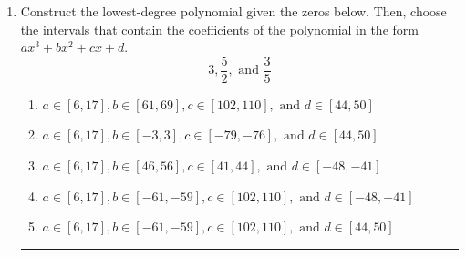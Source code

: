\documentclass[14pt]{extbook}
\newcommand{\litem}[1]{\item#1\hspace*{-1cm}\rule{\textwidth}{0.4pt}}
\begin{document}
\begin{enumerate}
{\begin{enumerate}[label=\Alph*.]
\end{enumerate} }
\litem{
Construct the lowest-degree polynomial given the zeros below. Then, choose the intervals that contain the coefficients of the polynomial in the form $ax^3+bx^2+cx+d$.\[ 3, \frac{5}{2}, \text{ and } \frac{3}{5} \]\begin{enumerate}[label=\Alph*.]
\item \( a \in [6, 17], b \in [61, 69], c \in [102, 110], \text{ and } d \in [44, 50] \)
\item \( a \in [6, 17], b \in [-3, 3], c \in [-79, -76], \text{ and } d \in [44, 50] \)
\item \( a \in [6, 17], b \in [46, 56], c \in [41, 44], \text{ and } d \in [-48, -41] \)
\item \( a \in [6, 17], b \in [-61, -59], c \in [102, 110], \text{ and } d \in [-48, -41] \)
\item \( a \in [6, 17], b \in [-61, -59], c \in [102, 110], \text{ and } d \in [44, 50] \)


\end{enumerate}}
\end{enumerate}
\end{document}
